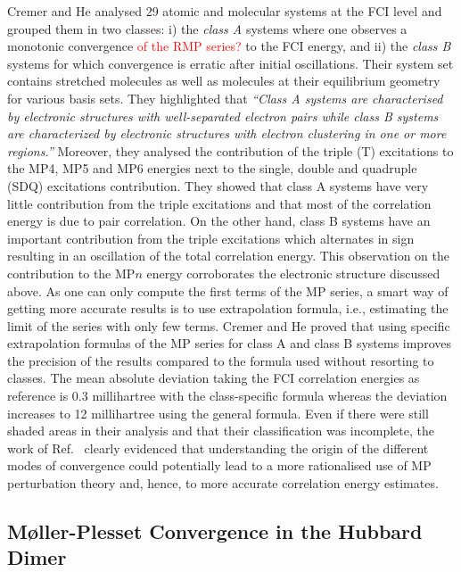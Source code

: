 \documentclass[aps,prb,reprint,noshowkeys,linenumbers,superscriptaddress]{revtex4-1}
\newcommand{\titou}[1]{\textcolor{red}{#1}}
\newcommand{\latin}[1]{#1}
\newcommand{\ie}{\latin{i.e.}}
\begin{document}
Cremer and He analysed 29 atomic and molecular systems at the FCI level \cite{Cremer_1996} and grouped them in two classes: i) the \textit{class A} systems where one observes a monotonic convergence \titou{of the RMP series?} to the FCI energy, and ii) the \textit{class B} systems for which convergence is erratic after initial oscillations. 
Their system set contains stretched molecules as well as molecules at their equilibrium geometry for various basis sets. 
They highlighted that \cite{Cremer_1996}
\textit{``Class A systems are characterised by electronic structures with well-separated electron pairs while class B systems are characterized by electronic structures with electron clustering in one or more regions.''}
Moreover, they analysed the contribution of the triple (T) excitations to the MP4, MP5 and MP6 energies next to the single, double and quadruple (SDQ) excitations contribution.
They showed that class A systems have very little contribution from the triple excitations and that most of the correlation energy is due to pair correlation. 
On the other hand, class B systems have an important contribution from the triple excitations which alternates in sign resulting in an oscillation of the total correlation energy.
This observation on the contribution to the MP$n$ energy corroborates the electronic structure discussed above.
As one can only compute the first terms of the MP series, a smart way of getting more accurate results is to use extrapolation formula, \ie, estimating the limit of the series with only few terms. 
Cremer and He proved that using specific extrapolation formulas of the MP series for class A and class B systems improves the precision of the results compared to the formula used without resorting to classes. \cite{Cremer_1996}
The mean absolute deviation taking the FCI correlation energies as reference is $0.3$ millihartree with the class-specific formula whereas the deviation increases to 12 millihartree using the general formula.  
Even if there were still shaded areas in their analysis and that their classification was incomplete, the work of Ref.~ clearly evidenced that understanding the origin of the different modes of convergence could potentially lead to a more rationalised use of MP perturbation theory and, hence, to more accurate correlation energy estimates.


\subsection{M{\o}ller-Plesset Convergence in the Hubbard Dimer}
\end{document}

